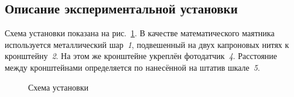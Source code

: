 \documentclass[a4paper, 12pt]{extarticle}
\begin{document}
\subsection{Описание экспериментальной установки}
Схема установки показана на рис.~\ref{fig:m11-equipment}. В качестве математического маятника используется металлический шар~\emph{1}, подвешенный на двух капроновых нитях к кронштейну~\emph{2}. На этом же кронштейне укреплён фотодатчик~\emph{4}. Расстояние между кронштейнами определяется по нанесённой на штатив шкале~\emph{5}. 

\begin{figure}[h]
\begin{center}
\end{center}
\caption{Схема установки \label{fig:m11-equipment}}
\end{figure}
\end{document}
